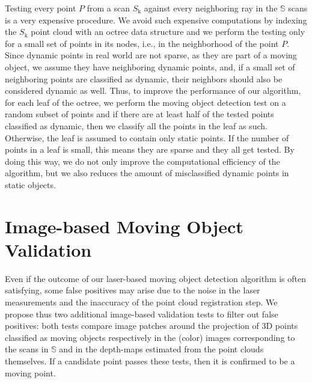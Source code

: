 Testing every point $P$ from a scan $S_{\text{k}}$ against every neighboring ray in the $\mathbb{S}$ scans is a very expensive procedure. We avoid such expensive computations by indexing the $S_{\text{k}}$ point cloud with an octree data structure and we perform the testing only for a small set of points in its nodes, i.e., in the neighborhood of the point $P$.
Since dynamic points in real world are not sparse, as they are part of a moving object, we assume they have neighboring dynamic points, and, if a small set of neighboring points are classified as dynamic, their neighbors should also be considered dynamic as well. 
Thus, to improve the performance of our algorithm, for each leaf of the octree, we perform the moving object detection test on a random subset of points and if there are at least half of the tested points classified as dynamic, then we classify all the points in the leaf as such. Otherwise, the leaf is assumed to contain only static points.
If the number of points in a leaf is small, this means they are sparse and they all get tested. By doing this way, we do not only improve the computational efficiency of the algorithm, but we also reduces the amount of misclassified dynamic points in static objects.

\section{Image-based Moving Object Validation}%
\label{sec:images}
Even if the outcome of our laser-based moving object detection algorithm is often satisfying, some false positives may arise due to the noise in the laser measurements and the inaccuracy of the point cloud registration step. 
We propose thus two additional image-based validation tests to filter out false positives: both tests compare image patches around the projection of 3D points classified as moving objects respectively in the (color) images corresponding to the scans in $\mathbb{S}$ and in the depth-maps estimated from the point clouds themselves. If a candidate point passes these tests, then it is confirmed to be a moving point.

